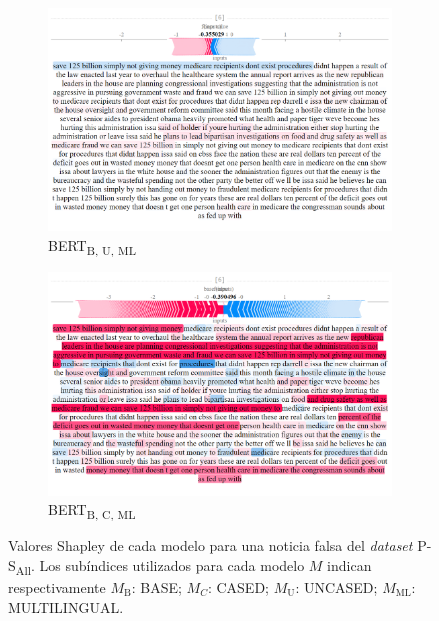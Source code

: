 \begin{figure}[!h]
    \captionsetup[subfigure]{justification=Centering}
  \captionsetup[subfigure]{justification=Centering}

    \begin{subfigure}[t]{0.4\textwidth}
        \includegraphics[width=\textwidth]{figs/all_F/bert-b-ml-u.png}
        \caption{{BERT}\textsubscript{B, U, ML}}
    \end{subfigure}
    \hspace{\fill} %
    \begin{subfigure}[t]{0.4\textwidth}
        \includegraphics[width=\linewidth]{figs/all_F/bert-b-ml-c.png}
        \caption{{BERT}\textsubscript{B, C, ML}}
    \end{subfigure}  
    
    \caption{Valores Shapley de cada modelo para una noticia falsa del \textit{dataset} {P-S}\textsubscript{All}. Los subíndices utilizados para cada modelo $M$ indican respectivamente $M_{\text{B}}$: BASE; $M_{C}$: CASED; $M_{\text{U}}$: UNCASED; $M_{\text{ML}}$: MULTILINGUAL.}
    \label{fig:shap-ps-all}
\end{figure}

